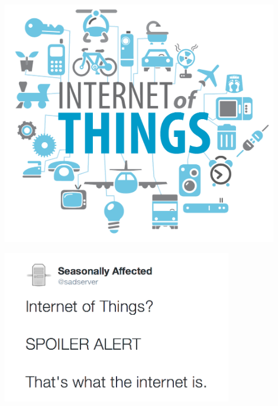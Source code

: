\begin{frame}[fragile]
  \begin{center}
    \includegraphics[width=0.9\textwidth]{images/iot}
    \label{fig:iot}
  \end{center}
\end{frame}

\begin{frame}[fragile]
  \begin{center}
    \includegraphics[width=0.75\textwidth]{images/sadserver1}
    \label{fig:spoiler}
  \end{center}
\end{frame}